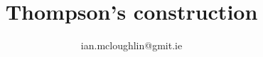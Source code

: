 \documentclass[dvipsnames, hidelinks]{beamer}
\begin{document}
  \title{Thompson's construction}
  \subtitle{}
  \author{ian.mcloughlin@gmit.ie}
  \date{}

  \begin{frame}
    \titlepage
  \end{frame}

   
\end{document}
